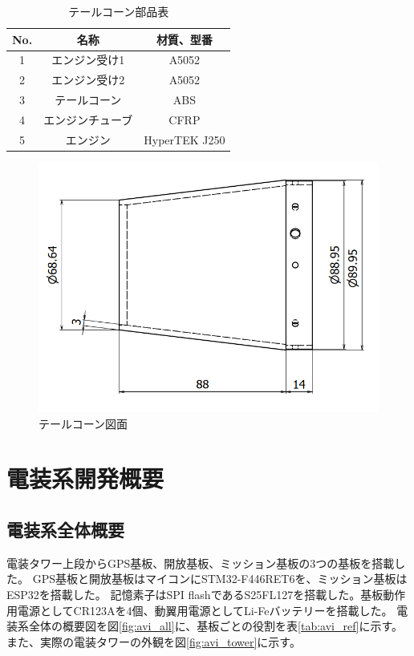 \documentclass[a4paper,11pt,uplatex]{jsarticle}
\begin{document}
\begin{table}[H]
	\centering
	\caption{テールコーン部品表}
	\begin{tabular}{ccc} \toprule
		No. & 名称       & 材質、型番         \\ \midrule
		1   & エンジン受け1  & A5052         \\
		2   & エンジン受け2  & A5052         \\
		3   & テールコーン   & ABS           \\
		4   & エンジンチューブ & CFRP          \\
		5   & エンジン     & HyperTEK J250 \\ \bottomrule
	\end{tabular}
	\label{s_tale_table}
\end{table}

\begin{figure}[H]
	\centering
	\includegraphics[scale = 0.6]{pic_str/s_talecorn_zumen.png}
	\caption{テールコーン図面}
	\label{s_tale_zumen}
\end{figure}

\newpage
\section{電装系開発概要}
\subsection{電装系全体概要}

電装タワー上段からGPS基板、開放基板、ミッション基板の3つの基板を搭載した。
GPS基板と開放基板はマイコンにSTM32-F446RET6を、ミッション基板はESP32を搭載した。
記憶素子はSPI flashであるS25FL127を搭載した。基板動作用電源としてCR123Aを4個、動翼用電源としてLi-Feバッテリーを搭載した。
電装系全体の概要図を図\ref{fig:avi_all}に、基板ごとの役割を表\ref{tab:avi_ref}に示す。
また、実際の電装タワーの外観を図\ref{fig:avi_tower}に示す。
\end{document}
